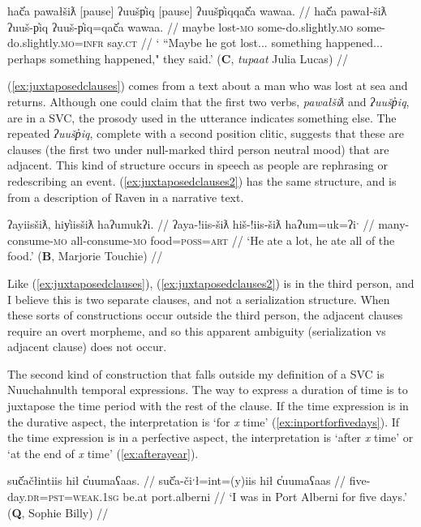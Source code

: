 \ex \label{ex:juxtaposedclauses}
\begingl
\glpreamble hač̓a pawałšiƛ [pause] ʔuušp̓iq [pause] ʔuušp̓iqqač̓a wawaa. //
\gla hač̓a pawał-šiƛ ʔuuš-p̓iq ʔuuš-p̓iq=qač̓a wawaa. //
\glb maybe lost-\textsc{mo} some-do.slightly.\textsc{mo} some-do.slightly.\textsc{mo}=\textsc{infr} say.\textsc{ct} //
\glft ` ``Maybe he got lost... something happened... perhaps something happened," they said.' (\textbf{C}, \textit{tupaat} Julia Lucas) //
\endgl
\xe

(\ref{ex:juxtaposedclauses}) comes from a text about a man who was lost at sea and returns. Although one could claim that the first two verbs, \textit{pawałšiƛ} and \textit{ʔuušp̓iq}, are in a SVC, the prosody used in the utterance indicates something else. The repeated \textit{ʔuušp̓iq}, complete with a second position clitic, suggests that these are clauses (the first two under null-marked third person neutral mood) that are adjacent. This kind of structure occurs in speech as people are rephrasing or redescribing an event. (\ref{ex:juxtaposedclauses2}) has the same structure, and is from a description of Raven in a narrative text.

\ex \label{ex:juxtaposedclauses2}
\begingl
\glpreamble ʔayiisšiƛ, hiy̓iisšiƛ haʔumukʔi. //
\gla ʔaya-!iis-šiƛ hiš-!iis-šiƛ haʔum=uk=ʔiˑ //
\glb many-consume-\textsc{mo} all-consume-\textsc{mo} food=\textsc{poss}=\textsc{art} //
\glft `He ate a lot, he ate all of the food.' (\textbf{B}, Marjorie Touchie) //
\endgl
\xe

Like (\ref{ex:juxtaposedclauses}), (\ref{ex:juxtaposedclauses2}) is in the third person, and I believe this is two separate clauses, and not a serialization structure. When these sorts of constructions occur outside the third person, the adjacent clauses require an overt morpheme, and so this apparent ambiguity (serialization vs adjacent clause) does not occur.

The second kind of construction that falls outside my definition of a SVC is Nuuchahnulth temporal expressions. The way to express a duration of time is to juxtapose the time period with the rest of the clause. If the time expression is in the durative aspect, the interpretation is `for \textit{x} time' (\ref{ex:inportforfivedays}). If the time expression is in a perfective aspect, the interpretation is `after \textit{x} time' or `at the end of \textit{x} time' (\ref{ex:afterayear}).

\ex \label{ex:inportforfivedays}
\begingl
\glpreamble suč̓ačłintiis hił c̓uumaʕaas. //
\gla suč̓a-čiˑł=int=(y)iis hił c̓uumaʕaas //
\glb five-day.\textsc{dr}=\textsc{pst}=\textsc{weak.1sg} be.at port.alberni //
\glft `I was in Port Alberni for five days.' (\textbf{Q}, Sophie Billy) //
\endgl
\xe

